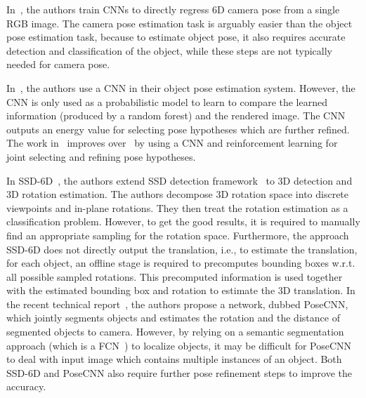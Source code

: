 \documentclass[conference]{IEEEtran}
\begin{document}
In~\cite{DBLP:conf/iccv/KendallGC15,kendall2017posenet}, the authors train CNNs to directly regress 6D camera pose from a single RGB image. The camera pose estimation task is arguably easier than the object pose estimation task, because to estimate object pose, it also requires accurate detection and classification of the object, while these steps are not typically needed for camera pose. 

In~\cite{ICCV15}, the authors use a CNN in their object pose estimation system. However,  %
the CNN is only used as a probabilistic model to learn to compare the learned information (produced by a random forest) and the rendered image. The CNN outputs an energy value for selecting pose hypotheses which are further refined. %
The work in~\cite{CVPR17_2} improves over~\cite{ICCV15} by using a CNN and reinforcement learning for joint selecting and refining pose hypotheses. 

In SSD-6D~\cite{SSD-6D}, the authors extend SSD detection framework~\cite{SSD} to 3D detection and 3D rotation estimation. The authors decompose 3D rotation space into discrete viewpoints and in-plane rotations. They then treat the rotation estimation as a classification problem. %
However, to get the good results, it is required to manually find an appropriate sampling for the rotation space. Furthermore, the approach SSD-6D does not directly output the translation, i.e., to estimate  the translation, for each object, an offline stage is required to precomputes bounding boxes w.r.t. all possible sampled rotations. This precomputed information is used together with the estimated bounding box and rotation to estimate the 3D translation. 
In the recent technical report~\cite{posecnn}, the authors propose a network, dubbed PoseCNN, which jointly segments objects and estimates the rotation and the distance of segmented objects to camera. However, by relying on a semantic segmentation approach (which is a FCN~\cite{FCN}) to localize objects, it may be difficult for PoseCNN to deal with input image which contains multiple instances of an object. 
Both SSD-6D and PoseCNN also require further pose refinement steps to improve the accuracy. 
\end{document}
